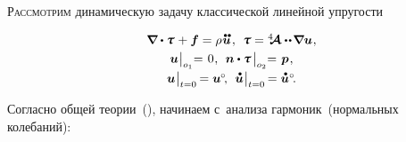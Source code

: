 \begin{otherlanguage}{russian}

\lettrine[lines=2, findent=2pt, nindent=0pt]{Р}{ассмотрим} динамическую задачу классической линейной упругости

\nopagebreak\vspace{-0.7em}\begin{equation}\label{classiclinearelasticity:problem}
\begin{array}{c}
\boldnabla \dotp \mathboldtau \hspace{.15ex} + \bm{f} = \rho \hspace{.1ex} \mathdotdotabove{\bm{u}} \hspace{.2ex} ,
\:\:
\mathboldtau = \stiffnesstensor \dotdotp \hspace{-0.25ex} \boldnabla {\bm{u}} \hspace{.1ex} ,
\\[.32em]
%
\bm{u} \hspace{0.1ex} \bigr|_{o_1} \hspace{-0.64ex} = \hspace{0.2ex} 0 \hspace{.1ex},
\:\:
\bm{n} \dotp \mathboldtau \hspace{0.25ex} \bigr|_{o_2} \hspace{-0.64ex} = \hspace{.2ex} \bm{p} \hspace{.16ex} ,
\\[.4em]
%
\bm{u} \hspace{0.1ex} \bigr|_{t=0} \hspace{-0.2ex} = \bm{u}^{\hspace{-0.1ex}\circ} \hspace{-0.4ex},
\:\:
\mathdotabove{\bm{u}} \hspace{0.1ex} \bigr|_{t=0} \hspace{-0.2ex} = \mathdotabove{\bm{u}}^{\circ} \hspace{-0.4ex} .
\end{array}
\end{equation}

\vspace{.2em} Согласно общей теории~(), начинаем с~анализа гармоник~(нормальных колебаний):


\end{otherlanguage}
